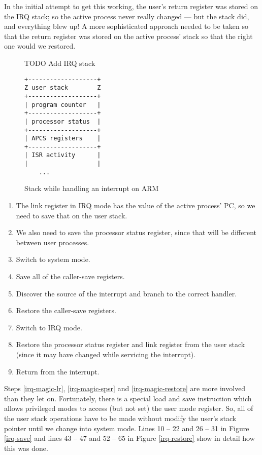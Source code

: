 \documentclass[12pt]{article}
\newcommand{\TODO}[1]{{\huge\color{red}TODO \Large #1}}
\begin{document}
In the initial attempt to get this working, the user's return register was
stored on the IRQ stack; so the active process never really changed \---- but
the stack did, and everything blew up! A more sophisticated approach needed to
be taken so that the return register was stored on the active process' stack so
that the right one would we restored.

\begin{figure}[h]
\caption{Stack while handling an interrupt on ARM}
\label{isr-stack-arm}
\TODO{Add IRQ stack}
\begin{verbatim}
+-------------------+
Z user stack        Z
+-------------------+
| program counter   |
+-------------------+
| processor status  |
+-------------------+
| APCS registers    |
+-------------------+
| ISR activity      |
|                   |
    ...
\end{verbatim}
\end{figure}

\begin{enumerate}
\item \label{irq-magic-lr}The link register in IRQ mode has the value of the
    active process' PC, so we need to save that on the user stack.
\item \label{irq-magic-spsr}We also need to save the processor status register,
    since that will be different between user processes. 
\item Switch to system mode.
\item Save all of the caller-save registers.
\item Discover the source of the interrupt and branch to the correct handler.
\item Restore the caller-save registers.
\item Switch to IRQ mode.
\item \label{irq-magic-restore}Restore the processor status register and link
    register from the user stack (since it may have changed while servicing the
    interrupt).
\item Return from the interrupt.
\end{enumerate}

Steps \ref{irq-magic-lr}, \ref{irq-magic-spsr} and \ref{irq-magic-restore}
are more involved than they let on. Fortunately, there is a special load and
save instruction which allows privileged modes to access (but not set) the user
mode register. So, all of the user stack operations have to be made without
modify the user's stack pointer until we change into system mode. Lines 10 \---
22 and 26 \--- 31 in Figure \ref{irq-save} and lines 43 \--- 47 and 52 \--- 65
in Figure \ref{irq-restore} show in detail how this was done.
\end{document}
